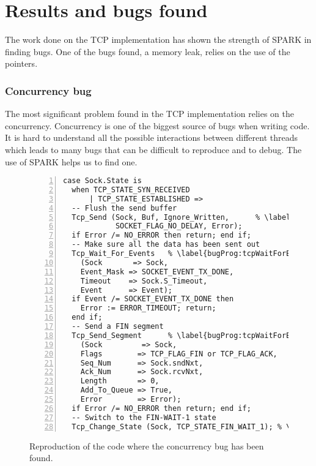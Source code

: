 \documentclass[runningheads]{llncs}
\begin{document}
\section{Results and bugs found}
\label{sec:results}

    The work done on the TCP implementation has shown the strength
    of SPARK in finding bugs. One of the bugs found, a memory leak,
    relies on the use of the pointers.

\subsubsection{Concurrency bug}

    The most significant problem found in the TCP implementation relies on the concurrency.
    Concurrency is one of the biggest source of bugs when writing code. It is hard to understand
    all the possible interactions between different threads which leads to many bugs that can be
    difficult to reproduce and to debug. The use of SPARK helps us to find one.
\begin{figure}[t]
\begin{lstlisting}[style=Spark, frame=bottomline, basicstyle=\ttfamily\footnotesize,
                    numbers=left, numberstyle=\tiny, escapechar=\%]
case Sock.State is
  when TCP_STATE_SYN_RECEIVED
      | TCP_STATE_ESTABLISHED =>
  -- Flush the send buffer
  Tcp_Send (Sock, Buf, Ignore_Written,      % \label{bugProg:tcpSend} %
            SOCKET_FLAG_NO_DELAY, Error);
  if Error /= NO_ERROR then return; end if;
  -- Make sure all the data has been sent out
  Tcp_Wait_For_Events   % \label{bugProg:tcpWaitForEvents} %
    (Sock       => Sock,
    Event_Mask => SOCKET_EVENT_TX_DONE,
    Timeout    => Sock.S_Timeout,
    Event      => Event);
  if Event /= SOCKET_EVENT_TX_DONE then
    Error := ERROR_TIMEOUT; return;
  end if;
  -- Send a FIN segment
  Tcp_Send_Segment      % \label{bugProg:tcpWaitForEventsPost} %
    (Sock         => Sock,
    Flags        => TCP_FLAG_FIN or TCP_FLAG_ACK,
    Seq_Num      => Sock.sndNxt,
    Ack_Num      => Sock.rcvNxt,
    Length       => 0,
    Add_To_Queue => True,
    Error        => Error);
  if Error /= NO_ERROR then return; end if;
  -- Switch to the FIN-WAIT-1 state
  Tcp_Change_State (Sock, TCP_STATE_FIN_WAIT_1); % \label{bugProg:tcpChangeState} %
\end{lstlisting}
\caption{Reproduction of the code where the concurrency bug has been found.}
\label{fig:concurrencyBug}
\end{figure}
\end{document}
